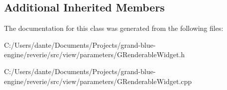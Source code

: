 \subsection*{Additional Inherited Members}


The documentation for this class was generated from the following files\+:\begin{DoxyCompactItemize}
\item 
C\+:/\+Users/dante/\+Documents/\+Projects/grand-\/blue-\/engine/reverie/src/view/parameters/G\+Renderable\+Widget.\+h\item 
C\+:/\+Users/dante/\+Documents/\+Projects/grand-\/blue-\/engine/reverie/src/view/parameters/G\+Renderable\+Widget.\+cpp\end{DoxyCompactItemize}
